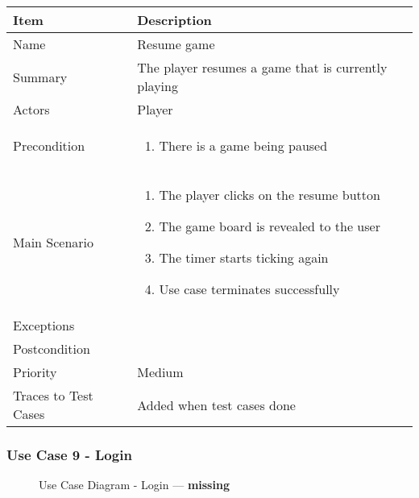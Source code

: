 \documentclass[12pt]{article}
\begin{document}
\begin{center}
\setlength{\tabcolsep}{18pt}
\renewcommand{\arraystretch}{1.3}
\begin{tabular}{ |p{3cm}|p{10cm}| }
    \hline
    \rowcolor{green}
   Item & Description \\
    \hline
    Name & Resume game \\
    \hline
    Summary & The player resumes a game that is currently playing \\
    \hline
    Actors & Player \\
    \hline
    Precondition & 
    \vspace*{-0.2in}
    \begin{enumerate}
        \item There is a game being paused
    \end{enumerate}  \\
    \hline
    Main Scenario &     
    \vspace*{-0.2in}
    \begin{enumerate}
        \item The player clicks on the resume button
        \item The game board is revealed to the user
        \item The timer starts ticking again
        \item Use case terminates successfully
    \end{enumerate}  \\
    \hline
    Exceptions &  \\
    \hline
    Postcondition & \\
    \hline
    Priority & Medium  \\
    \hline
    Traces to Test Cases & Added when test cases done  \\
    \hline
\end{tabular}
\end{center}

\newpage


\subsubsection{Use Case 9 - Login} \label{uc:9}

\begin{figure}[htbp]
    \centering
    \caption{Use Case Diagram - Login --- \textbf{missing}}
\end{figure}
\end{document}
